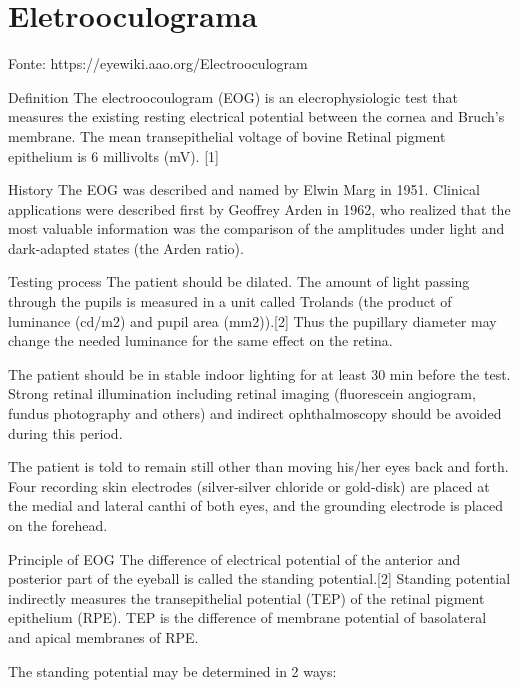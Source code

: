   \section{Eletrooculograma} 
Fonte: https://eyewiki.aao.org/Electrooculogram

  Definition
  The electroocoulogram (EOG) is an elecrophysiologic test that measures the existing resting electrical potential between the cornea and Bruch's membrane. The mean transepithelial voltage of bovine Retinal pigment epithelium is 6 millivolts (mV). [1]
  
  History
  The EOG was described and named by Elwin Marg in 1951. Clinical applications were described first by Geoffrey Arden in 1962, who realized that the most valuable information was the comparison of the amplitudes under light and dark-adapted states (the Arden ratio).
  
  Testing process
  The patient should be dilated. The amount of light passing through the pupils is measured in a unit called Trolands (the product of luminance (cd/m2) and pupil area (mm2)).[2] Thus the pupillary diameter may change the needed luminance for the same effect on the retina.
  
  The patient should be in stable indoor lighting for at least 30 min before the test. Strong retinal illumination including retinal imaging (fluorescein angiogram, fundus photography and others) and indirect ophthalmoscopy should be avoided during this period.
  
  The patient is told to remain still other than moving his/her eyes back and forth. Four recording skin electrodes (silver-silver chloride or gold-disk) are placed at the medial and lateral canthi of both eyes, and the grounding electrode is placed on the forehead. 
  
  Principle of EOG
  The difference of electrical potential of the anterior and posterior part of the eyeball is called the standing potential.[2] Standing potential indirectly measures the transepithelial potential (TEP) of the retinal pigment epithelium (RPE). TEP is the difference of membrane potential of basolateral and apical membranes of RPE.
  
  The standing potential may be determined in 2 ways:
  
